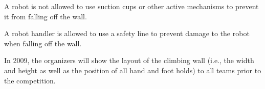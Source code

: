 \documentclass[12pt]{hurocup}
\begin{document}

\begin{lawlist}[CW]

\item A robot is not allowed to use suction cups or other active
  mechanisms to prevent it from falling off the wall.
\end{lawlist}

\begin{decisions}
\item A robot handler is allowed to use a safety line to prevent
  damage to the robot when falling off the wall.

\item In 2009, the organizers will show the layout of the climbing
  wall (i.e., the width and height as well as the position of all hand
  and foot holds) to all teams prior to the competition.
\end{decisions}

\label{rd:scoring}
\end{document}

